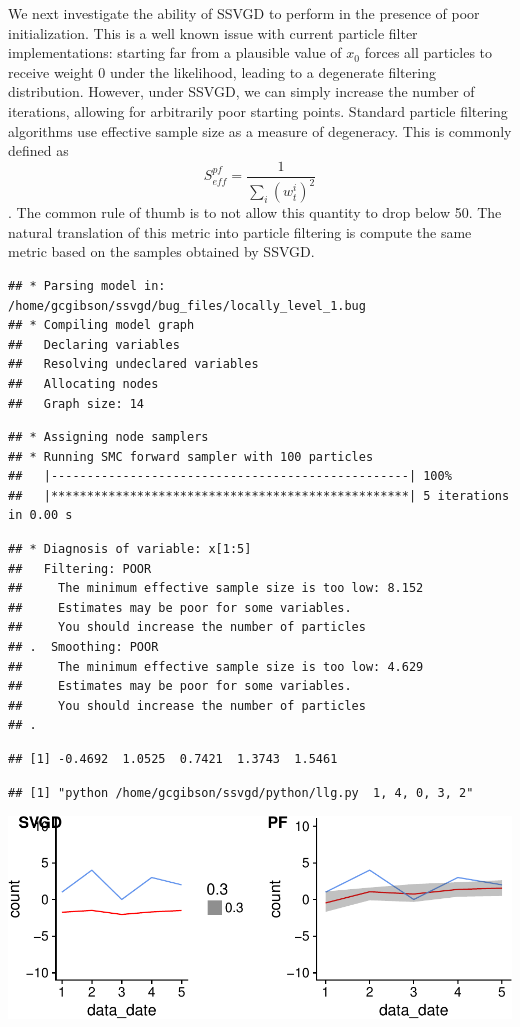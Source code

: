 \documentclass[]{article}
\begin{document}
We next investigate the ability of SSVGD to perform in the presence of
poor initialization. This is a well known issue with current particle
filter implementations: starting far from a plausible value of \(x_0\)
forces all particles to receive weight \(0\) under the likelihood,
leading to a degenerate filtering distribution. However, under SSVGD, we
can simply increase the number of iterations, allowing for arbitrarily
poor starting points. Standard particle filtering algorithms use
effective sample size as a measure of degeneracy. This is commonly
defined as \[S^{pf}_{eff} = \frac{1}{\sum_i (w_t^i)^2}\]. The common
rule of thumb is to not allow this quantity to drop below 50. The
natural translation of this metric into particle filtering is compute
the same metric based on the samples obtained by SSVGD.

\begin{verbatim}
## * Parsing model in: /home/gcgibson/ssvgd/bug_files/locally_level_1.bug
## * Compiling model graph
##   Declaring variables
##   Resolving undeclared variables
##   Allocating nodes
##   Graph size: 14
\end{verbatim}

\begin{verbatim}
## * Assigning node samplers
## * Running SMC forward sampler with 100 particles
##   |--------------------------------------------------| 100%
##   |**************************************************| 5 iterations in 0.00 s
\end{verbatim}

\begin{verbatim}
## * Diagnosis of variable: x[1:5] 
##   Filtering: POOR
##     The minimum effective sample size is too low: 8.152 
##     Estimates may be poor for some variables.
##     You should increase the number of particles
## .  Smoothing: POOR
##     The minimum effective sample size is too low: 4.629 
##     Estimates may be poor for some variables.
##     You should increase the number of particles
## .
\end{verbatim}

\begin{verbatim}
## [1] -0.4692  1.0525  0.7421  1.3743  1.5461
\end{verbatim}

\begin{verbatim}
## [1] "python /home/gcgibson/ssvgd/python/llg.py  1, 4, 0, 3, 2"
\end{verbatim}

\includegraphics{ssvgd_files/figure-latex/unnamed-chunk-4-1.pdf}
\end{document}
